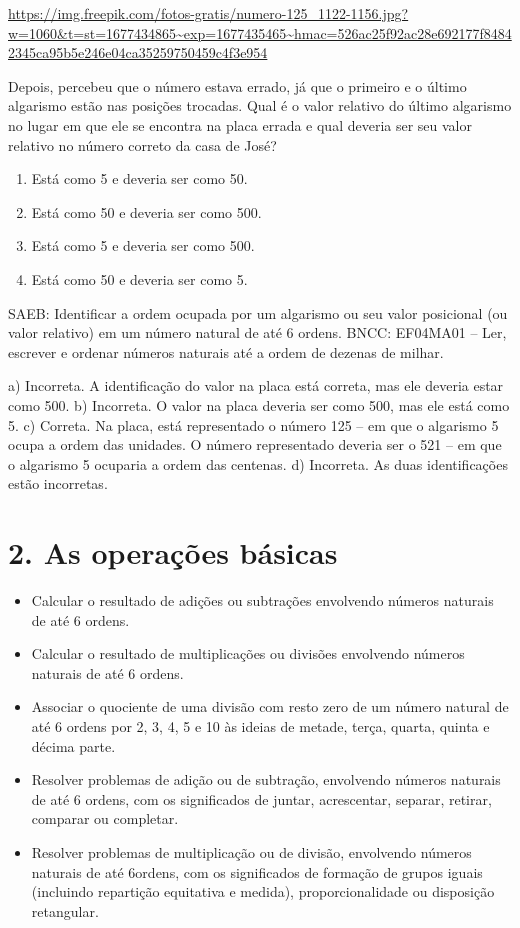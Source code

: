 \begin{enumerate}
\url{https://img.freepik.com/fotos-gratis/numero-125_1122-1156.jpg?w=1060\&t=st=1677434865~exp=1677435465~hmac=526ac25f92ac28e692177f84842345ca95b5e246e04ca35259750459c4f3e954}

Depois, percebeu que o número estava
errado, já que o primeiro e o último algarismo estão nas posições
trocadas. Qual é o valor relativo do último algarismo no lugar em que ele se
encontra na placa errada e qual deveria ser seu valor relativo no número
correto da casa de José?

\begin{enumerate}
\def\labelenumi{\alph{enumi})}
\item
  Está como 5 e deveria ser como 50.
\item
  Está como 50 e deveria ser como 500.
\item
  Está como 5 e deveria ser como 500.
\item
  Está como 50 e deveria ser como 5.
\end{enumerate}

SAEB: Identificar a ordem ocupada por um algarismo ou seu valor posicional (ou valor relativo) em um número natural de até 6 ordens.
BNCC: EF04MA01 -- Ler, escrever e ordenar números naturais até a ordem de dezenas de milhar.

a)  Incorreta. A identificação do valor na placa está correta, mas ele deveria estar como 500.
b)  Incorreta. O valor na placa deveria ser como 500, mas ele está como 5.
c)  Correta. Na placa, está representado o número 125 -- em que o algarismo 5 ocupa a ordem das unidades. O número representado deveria ser o 521 -- em que o algarismo 5 ocuparia a ordem das centenas.
d)  Incorreta. As duas identificações estão incorretas.


\section{2. As operações básicas}\label{muxf3dulo-2}


\begin{itemize}
\item Calcular o resultado de adições ou subtrações envolvendo números
naturais de até 6 ordens.
\item Calcular o resultado de multiplicações ou divisões envolvendo números
naturais de até 6 ordens.
\item Associar o quociente de uma divisão com resto zero de um número
natural de até 6 ordens por 2, 3, 4, 5 e 10 às ideias de metade, terça,
quarta, quinta e décima parte.
\item Resolver problemas de adição ou de subtração, envolvendo números
naturais de até 6 ordens, com os significados de juntar, acrescentar,
separar, retirar, comparar ou completar.
\item Resolver problemas de multiplicação ou de divisão, envolvendo números
naturais de até 6ordens, com os significados de formação de grupos
iguais (incluindo repartição equitativa e medida), proporcionalidade ou
disposição retangular.
\end{itemize}


\end{enumerate}
